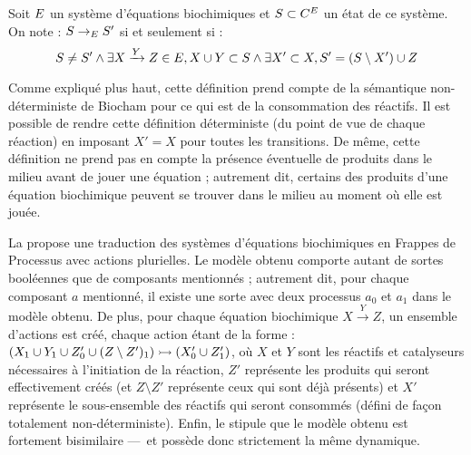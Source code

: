 \begin{definition}
  Soit $E$ un système d'équations biochimiques
  et $S \subset C^{E}$ un état de ce système.
  On note : $S \rightarrow_{E} S'$ si et seulement si :
  \[S \neq S' \wedge
    \exists X \xrightarrow{Y} Z \in E,
    X \cup Y \subset S \wedge
    \exists X' \subset X, S' = (S \setminus X') \cup Z\]
\end{definition}

\begin{remark}
  Comme expliqué plus haut,
  cette définition prend compte de la sémantique non-déterministe de Biocham pour ce qui est
  de la consommation des réactifs.
  Il est possible de rendre cette définition déterministe (du point de vue de chaque réaction)
  en imposant $X' = X$ pour toutes les transitions.
  De même, cette définition ne prend pas en compte la présence éventuelle de produits
  dans le milieu avant de jouer une équation ;
  autrement dit, certains des produits d'une équation biochimique
  peuvent se trouver dans le milieu au moment où elle est jouée.
\end{remark}

La  propose une traduction des systèmes d'équations biochimiques
en Frappes de Processus avec actions plurielles.
Le modèle obtenu comporte autant de sortes booléennes que de composants mentionnés ;
autrement dit, pour chaque composant $a$ mentionné, il existe une sorte avec deux processus
$a_0$ et $a_1$ dans le modèle obtenu.
De plus, pour chaque équation biochimique $X \xrightarrow{Y} Z$,
un ensemble d'actions est créé, chaque action étant de la forme :
$\mbox{$(X_1 \cup Y_1 \cup Z'_0 \cup (Z \setminus Z')_1) \rightarrowtail (X'_0 \cup Z'_1)$}$,
où $X$ et $Y$ sont les réactifs et catalyseurs nécessaires à l'initiation de la réaction,
$Z'$ représente les produits qui seront effectivement créés
(et $Z \setminus Z'$ représente ceux qui sont déjà présents) et
$X'$ représente le sous-ensemble des réactifs qui seront consommés
(défini de façon totalement non-déterministe).
Enfin, le  stipule que le modèle obtenu
est fortement bisimilaire ---~et possède donc strictement la même dynamique.


